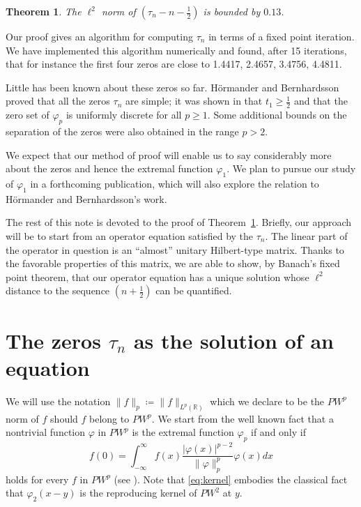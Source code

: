 \documentclass[12pt]{amsart}
\theoremstyle{plain}
\newtheorem{theorem}{Theorem}
\begin{document}
\begin{theorem}\label{thm:HB}
The $\ell^2$ norm of $(\tau_n-n-\frac12)$  is bounded by $0.13$. 

\end{theorem}

 Our proof gives an algorithm for computing $\tau_n$ in terms of a fixed point 
iteration. We have implemented this algorithm numerically and found, after 15 iterations, that for instance the first four zeros 
are close to 1.4417, 2.4657, 3.4756, 4.4811.
 
Little has been known about these zeros so far. H\"{o}rmander and Bernhardsson proved that all the zeros $\tau_n$ are simple; it was shown in \cite{BCOS} that $t_1\ge \frac{1}{2}$ and that the zero set of $\varphi_p$ is uniformly discrete for all $p\ge 1$. Some additional bounds on the separation of the zeros were also obtained in the range $p>2$.

We expect that our method of proof will enable us to say considerably more about the zeros and hence the extremal function $\varphi_1$. We plan to pursue our study of $\varphi_1$ in a forthcoming publication, which will also explore the relation to H\"{o}rmander and Bernhardsson's work. 

The rest of this note is devoted to the proof of Theorem~\ref{thm:HB}. Briefly, our approach will be to start from an operator equation satisfied by the $\tau_n$. The linear part of the 
operator in question is an ``almost'' unitary Hilbert-type matrix. Thanks to the favorable properties of this matrix, we are able to show, by Banach's fixed point theorem, that our operator equation has a unique solution whose $\ell^2$ distance to the sequence $(n+\frac12)$ can be quantified. 
\section{The zeros \texorpdfstring{$\tau_n$}{tn} as the solution of an 
equation}

We will use the notation $\| f \|_p\coloneqq \| f\|_{L^p(\mathbb R)}$ which we declare to be the $PW^p$ norm of $f$ should $f$ belong to $PW^p$. We start from the well known fact that a nontrivial function $\varphi$ in $PW^p$ is the extremal function $\varphi_p$ if and only if
\begin{equation} \label{eq:kernel}  f(0)=\int_{-\infty}^\infty f(x) \frac{|\varphi(x)|^{p-2}}{\|\varphi\|_{p}^p} \varphi(x) dx \end{equation}
holds for every $f$ in $PW^p$ (see \cite[Thm. 36]{BCOS}). Note that \eqref{eq:kernel} embodies the classical fact that $\varphi_2(x-y)$ is the reproducing kernel of $PW^2$ at $y$. 
\end{document}
